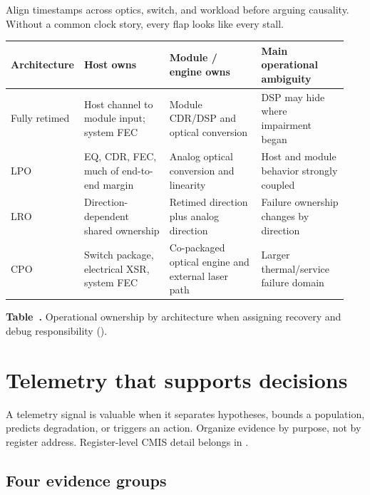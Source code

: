 Align timestamps across optics, switch, and workload before arguing causality.
Without a common clock story, every flap looks like every stall.

\begin{table}[ht]
\label{tab:networking-ownership}%
\centering
\setlength{\tabcolsep}{3pt}%
\footnotesize
\renewcommand{\arraystretch}{1.2}%
\begin{tabular}{@{}p{0.14\linewidth}p{0.26\linewidth}p{0.28\linewidth}p{0.26\linewidth}@{}}
\toprule
Architecture & Host owns & Module / engine owns & Main operational ambiguity \\
\midrule
Fully retimed &
Host channel to module input; system FEC &
Module CDR/DSP and optical conversion &
DSP may hide where impairment began \\
\addlinespace[0.8em]
LPO &
EQ, CDR, FEC, much of end-to-end margin &
Analog optical conversion and linearity &
Host and module behavior strongly coupled \\
\addlinespace[0.8em]
LRO &
Direction-dependent shared ownership &
Retimed direction plus analog direction &
Failure ownership changes by direction \\
\addlinespace[0.8em]
CPO &
Switch package, electrical XSR, system FEC &
Co-packaged optical engine and external laser path &
Larger thermal/service failure domain \\
\bottomrule
\end{tabular}
\par\medskip
{\raggedright\footnotesize\textbf{Table~\thetable.} Operational ownership by
architecture when assigning recovery and debug responsibility
().\par}
\end{table}
\FloatBarrier

\section{Telemetry that supports decisions}
\label{sec:networking-ops}

A telemetry signal is valuable when it separates hypotheses, bounds a
population, predicts degradation, or triggers an action. Organize evidence by
purpose, not by register address. Register-level CMIS detail belongs in
.

\subsection{Four evidence groups}

